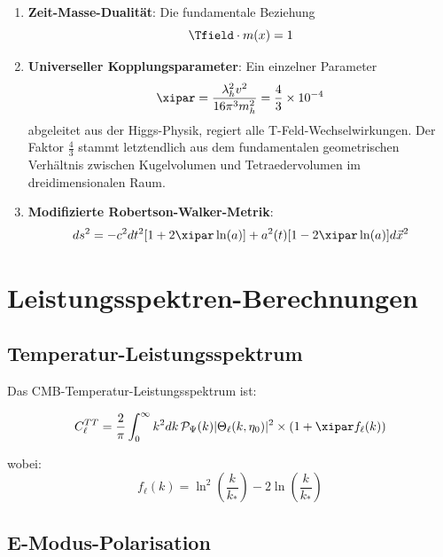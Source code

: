 	\begin{enumerate}
		\item \textbf{Zeit-Masse-Dualität}: Die fundamentale Beziehung
		\begin{equation}
			\Tfield \cdot m(x) = 1
			\label{eq:time_mass_duality}
		\end{equation}
		
		\item \textbf{Universeller Kopplungsparameter}: Ein einzelner Parameter
		\begin{equation}
			\xipar = \frac{\lambda_h^2 v^2}{16\pi^3 m_h^2} = \frac{4}{3} \times 10^{-4}
			\label{eq:xi_definition}
		\end{equation}
		abgeleitet aus der Higgs-Physik, regiert alle T-Feld-Wechselwirkungen. Der Faktor $\frac{4}{3}$ stammt letztendlich aus dem fundamentalen geometrischen Verhältnis zwischen Kugelvolumen und Tetraedervolumen im dreidimensionalen Raum.
		
		\item \textbf{Modifizierte Robertson-Walker-Metrik}:
		\begin{equation}
			ds^2 = -c^2dt^2[1 + 2\xipar\ln(a)] + a^2(t)[1 - 2\xipar\ln(a)]d\vec{x}^2
			\label{eq:modified_metric}
		\end{equation}
	\end{enumerate}
	
	\section{Leistungsspektren-Berechnungen}
	\label{sec:power_spectra}
	
	\subsection{Temperatur-Leistungsspektrum}
	
	Das CMB-Temperatur-Leistungsspektrum ist:
	
	\begin{equation}
		C_\ell^{TT} = \frac{2}{\pi}\int_0^\infty k^2 dk \, \mathcal{P}_\Psi(k) |\Theta_\ell(k,\eta_0)|^2 \times \left(1 + \xipar f_\ell(k)\right)
		\label{eq:cl_tt}
	\end{equation}
	
	wobei:
	\begin{equation}
		f_\ell(k) = \ln^2\left(\frac{k}{k_*}\right) - 2\ln\left(\frac{k}{k_*}\right)
	\end{equation}
	
	\subsection{E-Modus-Polarisation}
	
